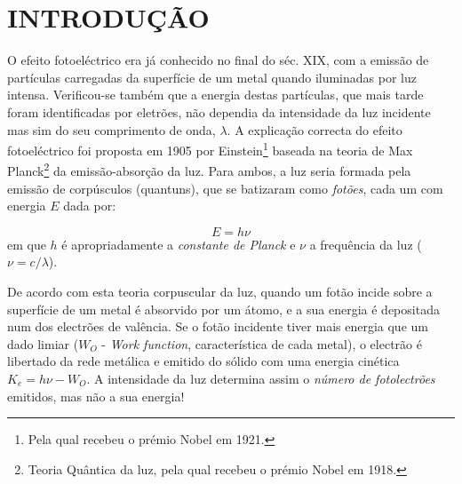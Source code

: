 \documentclass[a4paper,12pt]{article}  %
\begin{document}
\section{\sf INTRODUÇÃO }
O efeito fotoeléctrico era já conhecido no final do séc. XIX, com a emissão  de partículas carregadas da superfície de um metal quando iluminadas por luz intensa. Verificou-se também que a energia destas partículas, que mais tarde foram identificadas por eletrões, não dependia da intensidade da luz incidente mas sim do  seu comprimento de onda, $\lambda$.  A explicação correcta do efeito fotoeléctrico foi proposta em 1905 por Einstein\footnote{Pela qual recebeu o prémio Nobel em 1921.} baseada na teoria de Max Planck\footnote{Teoria Quântica da luz, pela qual recebeu o prémio Nobel em 1918.} da emissão-absorção da luz. Para ambos, a luz seria formada pela emissão de  corpúsculos (quantuns), que se batizaram como \emph{fotões}, cada um com energia $E$  dada por:

\begin{equation}
	\label{eq:energia2}
	E = h \nu %
\end{equation}
em que $h$ é apropriadamente a \emph{constante de Planck} e $\nu$ a frequência da luz ($\nu=c/\lambda$).  

De acordo com esta teoria corpuscular da luz, quando um fotão incide sobre a superfície de um metal é absorvido por um átomo, e a sua energia é depositada num dos electrões de valência.
 Se o fotão incidente tiver mais energia que um dado limiar ($W_O$ - \emph{Work function}, característica de cada metal), o  electrão é libertado da rede metálica e emitido do sólido com uma energia cinética $K_e = h\nu - W_O$.
A intensidade da luz determina assim o \emph{número de fotolectrões} emitidos, mas não a sua energia!
\end{document}
